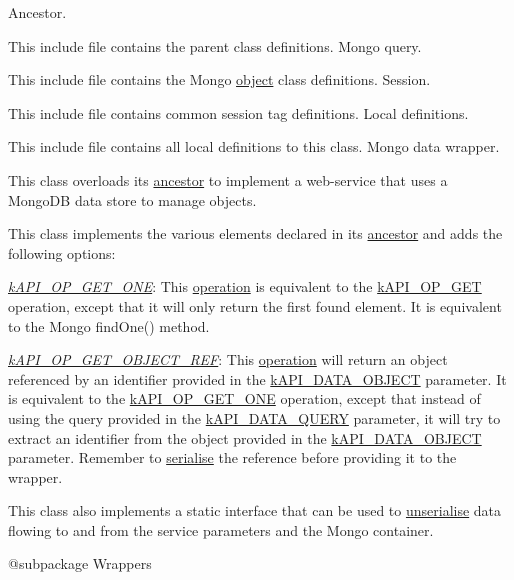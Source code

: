 Ancestor.

This include file contains the parent class definitions. Mongo query.

This include file contains the Mongo \hyperlink{class_c_mongo_query}{object} class definitions. Session.

This include file contains common session tag definitions. Local definitions.

This include file contains all local definitions to this class. Mongo data wrapper.

This class overloads its \hyperlink{class_c_data_wrapper}{ancestor} to implement a web-\/service that uses a Mongo\-D\-B data store to manage objects.

This class implements the various elements declared in its \hyperlink{class_c_data_wrapper}{ancestor} and adds the following options\-:


\begin{DoxyItemize}
\item {\itshape \hyperlink{}{k\-A\-P\-I\-\_\-\-O\-P\-\_\-\-G\-E\-T\-\_\-\-O\-N\-E}}\-: This \hyperlink{}{operation} is equivalent to the \hyperlink{}{k\-A\-P\-I\-\_\-\-O\-P\-\_\-\-G\-E\-T} operation, except that it will only return the first found element. It is equivalent to the Mongo find\-One() method. 
\item {\itshape \hyperlink{}{k\-A\-P\-I\-\_\-\-O\-P\-\_\-\-G\-E\-T\-\_\-\-O\-B\-J\-E\-C\-T\-\_\-\-R\-E\-F}}\-: This \hyperlink{}{operation} will return an object referenced by an identifier provided in the \hyperlink{}{k\-A\-P\-I\-\_\-\-D\-A\-T\-A\-\_\-\-O\-B\-J\-E\-C\-T} parameter. It is equivalent to the \hyperlink{}{k\-A\-P\-I\-\_\-\-O\-P\-\_\-\-G\-E\-T\-\_\-\-O\-N\-E} operation, except that instead of using the query provided in the \hyperlink{}{k\-A\-P\-I\-\_\-\-D\-A\-T\-A\-\_\-\-Q\-U\-E\-R\-Y} parameter, it will try to extract an identifier from the object provided in the \hyperlink{}{k\-A\-P\-I\-\_\-\-D\-A\-T\-A\-\_\-\-O\-B\-J\-E\-C\-T} parameter. Remember to \hyperlink{class_c_data_type_a608d6fc184bce537ce83669f729d6008}{serialise} the reference before providing it to the wrapper. 
\end{DoxyItemize}

This class also implements a static interface that can be used to \hyperlink{}{unserialise} data flowing to and from the service parameters and the Mongo container.

\begin{DoxyVerb}    @subpackage     Wrappers\end{DoxyVerb}


